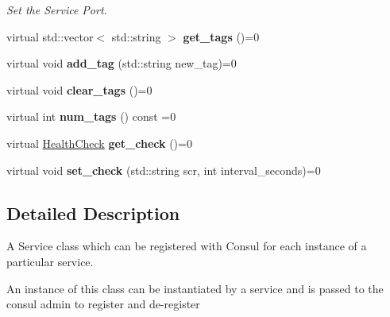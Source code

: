 \begin{DoxyCompactItemize}
\begin{DoxyCompactList}\small\item\em Set the Service Port. \end{DoxyCompactList}\item 
\hypertarget{classServiceInterface_afdc1ce12ef5ff09cf82e3d0f8ea7724a}{virtual std\-::vector$<$ std\-::string $>$ {\bfseries get\-\_\-tags} ()=0}\label{classServiceInterface_afdc1ce12ef5ff09cf82e3d0f8ea7724a}

\item 
\hypertarget{classServiceInterface_ac8b80c9301fa04ea295acecd88b9cc42}{virtual void {\bfseries add\-\_\-tag} (std\-::string new\-\_\-tag)=0}\label{classServiceInterface_ac8b80c9301fa04ea295acecd88b9cc42}

\item 
\hypertarget{classServiceInterface_a3e27c216421be0e92984b07a095f1279}{virtual void {\bfseries clear\-\_\-tags} ()=0}\label{classServiceInterface_a3e27c216421be0e92984b07a095f1279}

\item 
\hypertarget{classServiceInterface_aad0434e39242a47048659a1243fab46e}{virtual int {\bfseries num\-\_\-tags} () const =0}\label{classServiceInterface_aad0434e39242a47048659a1243fab46e}

\item 
\hypertarget{classServiceInterface_afa5e0a43120dcd89dfcf7ae8aa086217}{virtual \hyperlink{structHealthCheck}{Health\-Check} {\bfseries get\-\_\-check} ()=0}\label{classServiceInterface_afa5e0a43120dcd89dfcf7ae8aa086217}

\item 
\hypertarget{classServiceInterface_a32065df2094fa5a53708f5ff3944195b}{virtual void {\bfseries set\-\_\-check} (std\-::string scr, int interval\-\_\-seconds)=0}\label{classServiceInterface_a32065df2094fa5a53708f5ff3944195b}

\end{DoxyCompactItemize}


\subsection{Detailed Description}
A Service class which can be registered with Consul for each instance of a particular service. 

An instance of this class can be instantiated by a service and is passed to the consul admin to register and de-\/register 

